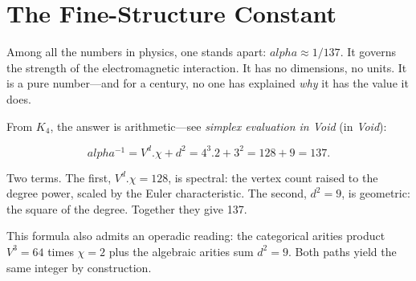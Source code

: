 \documentclass[11pt,a4paper]{book}
\def\alpha{alpha}%
\def\cdot{.}%
\newcommand{\VoidRef}[2]{\textit{#2} (in \textit{Void})}
\begin{document}
\section{The Fine-Structure Constant}

Among all the numbers in physics, one stands apart: $\alpha \approx 1/137$. It governs the strength of the electromagnetic interaction. It has no dimensions, no units. It is a pure number---and for a century, no one has explained \emph{why} it has the value it does.

From $K_4$, the answer is arithmetic---see \VoidRef{sec:simplex-eval}{simplex evaluation in Void}:

\[
\alpha^{-1} = V^d \cdot \chi + d^2 = 4^3 \cdot 2 + 3^2 = 128 + 9 = 137.
\]

Two terms. The first, $V^d \cdot \chi = 128$, is spectral: the vertex count raised to the degree power, scaled by the Euler characteristic. The second, $d^2 = 9$, is geometric: the square of the degree. Together they give 137.

This formula also admits an operadic reading: the categorical arities product $V^3 = 64$ times $\chi = 2$ plus the algebraic arities sum $d^2 = 9$. Both paths yield the same integer by construction.
\end{document}
